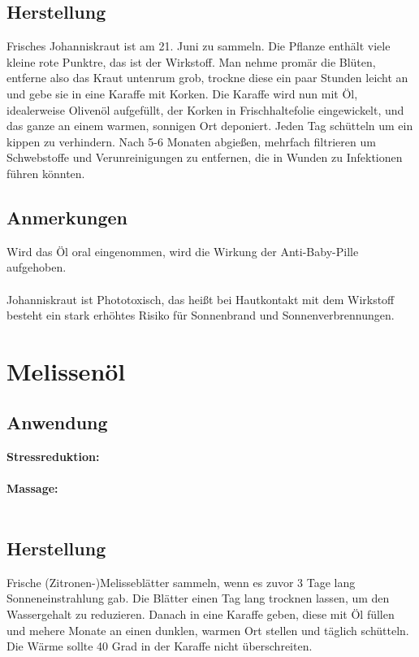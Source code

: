 \subsection{Herstellung}

Frisches Johanniskraut ist am 21. Juni zu sammeln. Die Pflanze enthält viele kleine rote Punktre, das ist der Wirkstoff. Man nehme promär die Blüten, entferne also das Kraut untenrum grob, trockne diese ein paar Stunden leicht an und gebe sie in eine Karaffe mit Korken. Die Karaffe wird nun mit Öl, idealerweise Olivenöl aufgefüllt, der Korken in Frischhaltefolie eingewickelt, und das ganze an einem warmen, sonnigen Ort deponiert. Jeden Tag schütteln um ein kippen zu verhindern. Nach 5-6 Monaten abgießen, mehrfach filtrieren um Schwebstoffe und Verunreinigungen zu entfernen, die in Wunden zu Infektionen führen könnten.

\subsection{Anmerkungen}

Wird das Öl oral eingenommen, wird die Wirkung der Anti-Baby-Pille aufgehoben.\\ \\
Johanniskraut ist Phototoxisch, das heißt bei Hautkontakt mit dem Wirkstoff besteht ein stark erhöhtes Risiko für Sonnenbrand und Sonnenverbrennungen.


\section{Melissenöl}

\subsection{Anwendung}

\textbf{Stressreduktion:} \\ \\
\textbf{Massage:} \\ \\


\subsection{Herstellung}

Frische (Zitronen-)Melisseblätter sammeln, wenn es zuvor 3 Tage lang Sonneneinstrahlung gab. Die Blätter einen Tag lang trocknen lassen, um den Wassergehalt zu reduzieren. Danach in eine Karaffe geben, diese mit Öl füllen und mehere Monate an einen dunklen, warmen Ort stellen und täglich schütteln. Die Wärme sollte 40 Grad in der Karaffe nicht überschreiten.

